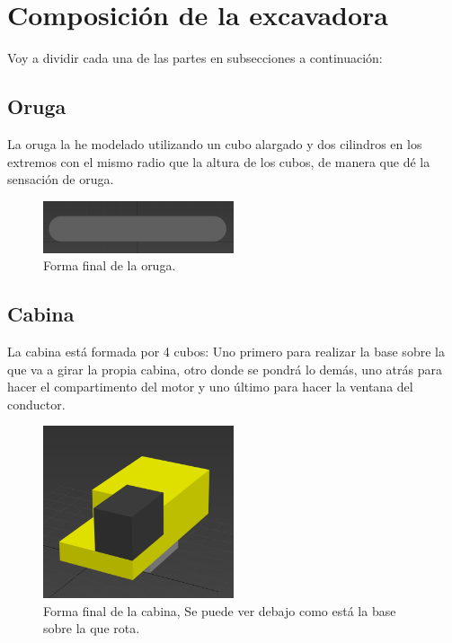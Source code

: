 \section{Composición de la excavadora}

Voy a dividir cada una de las partes en subsecciones a continuación:

\subsection{Oruga}

La oruga la he modelado utilizando un cubo alargado y dos cilindros en los extremos con el mismo radio que la altura de los cubos, de manera que dé la sensación de oruga.

\begin{figure}[H]
   \centering
   \includegraphics[width=0.5\textwidth]{imagenes/oruga.png}
   \caption{Forma final de la oruga.}
\end{figure}

\newpage

\subsection{Cabina}

La cabina está formada por 4 cubos: Uno primero para realizar la base sobre la que va a girar la propia cabina, otro donde se pondrá lo demás, uno atrás para hacer el compartimento del motor y uno último para hacer la ventana del conductor.

\begin{figure}[H]
   \centering
   \includegraphics[width=0.5\textwidth]{imagenes/cabina.png}
   \caption{Forma final de la cabina, Se puede ver debajo como está la base sobre la que rota.}
\end{figure}


